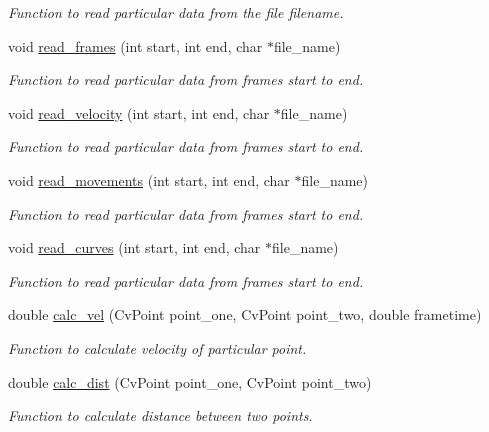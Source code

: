 \begin{DoxyCompactItemize}
\begin{DoxyCompactList}\small\item\em Function to read particular data from the file {\itshape filename\/}. \end{DoxyCompactList}\item 
void \hyperlink{namespaceGmswriter_abbf023742c3a026bb42ff2b68f5c2b7b}{read\_\-frames} (int start, int end, char $\ast$file\_\-name)
\begin{DoxyCompactList}\small\item\em Function to read particular data from frames {\itshape start\/} to {\itshape end\/}. \end{DoxyCompactList}\item 
void \hyperlink{namespaceGmswriter_ae4ec14e80fdad25145c25e03e3b349d8}{read\_\-velocity} (int start, int end, char $\ast$file\_\-name)
\begin{DoxyCompactList}\small\item\em Function to read particular data from frames {\itshape start\/} to {\itshape end\/}. \end{DoxyCompactList}\item 
void \hyperlink{namespaceGmswriter_afe6922decd16e426c40bbfcedb3577dd}{read\_\-movements} (int start, int end, char $\ast$file\_\-name)
\begin{DoxyCompactList}\small\item\em Function to read particular data from frames {\itshape start\/} to {\itshape end\/}. \end{DoxyCompactList}\item 
void \hyperlink{namespaceGmswriter_aeaedba186d745f9fe60b3c6c506c5c83}{read\_\-curves} (int start, int end, char $\ast$file\_\-name)
\begin{DoxyCompactList}\small\item\em Function to read particular data from frames {\itshape start\/} to {\itshape end\/}. \end{DoxyCompactList}\item 
double \hyperlink{namespaceGmswriter_a70dd5f1fd34ef721305c179cba2a1512}{calc\_\-vel} (CvPoint point\_\-one, CvPoint point\_\-two, double frametime)
\begin{DoxyCompactList}\small\item\em Function to calculate velocity of particular point. \end{DoxyCompactList}\item 
double \hyperlink{namespaceGmswriter_a15d6b1b21ea4ed5da9a580b09e17a5b1}{calc\_\-dist} (CvPoint point\_\-one, CvPoint point\_\-two)
\begin{DoxyCompactList}\small\item\em Function to calculate distance between two points. \end{DoxyCompactList}\end{DoxyCompactItemize}


